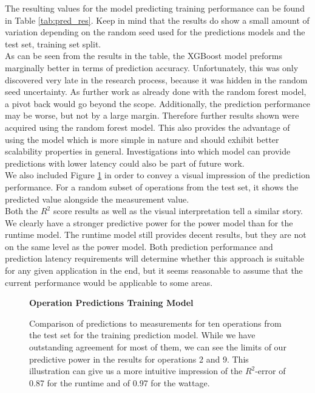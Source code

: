 The resulting values for the model predicting training performance can be found in Table \ref{tab:pred_res}. Keep in mind that the results do show a small amount of variation depending on the random seed used for the predictions models and the test set, training set split. \\
As can be seen from the results in the table, the XGBoost model preforms marginally better in terms of prediction accuracy. Unfortunately, this was only discovered very late in the research process, because it was hidden in the random seed uncertainty. As further work as already done with the random forest model, a pivot back would go beyond the scope. Additionally, the prediction performance may be worse, but not by a large margin. Therefore further results shown were acquired using the random forest model. This also provides the advantage of using the model which is more simple in nature and should exhibit better scalability properties in general. Investigations into which model can provide predictions with lower latency could also be part of future work. \\
We also included Figure \ref{fig:testsetoperations} in order to convey a visual impression of the prediction performance. For a random subset of operations from the test set, it shows the predicted value alongside the measurement value. \\
Both the $R^2$ score results as well as the visual interpretation tell a similar story. We clearly have a stronger predictive power for the power model than for the runtime model. The runtime model still provides decent results, but they are not on the same level as the power model. Both prediction performance and prediction latency requirements will determine whether this approach is suitable for any given application in the end, but it seems reasonable to assume that the current performance would be applicable to some areas.


\begin{figure}[htbp]
    \centering
    \parbox{1.1\textwidth}{\centering\textbf{Operation Predictions Training Model}}
    \caption{Comparison of predictions to measurements for ten operations from the test set for the training prediction model. While we have outstanding agreement for most of them, we can see the limits of our predictive power in the results for operations 2 and 9. This illustration can give us a more intuitive impression of the $R^2$-error of 0.87 for the runtime and of 0.97 for the wattage.}
    \label{fig:testsetoperations}
\end{figure}


